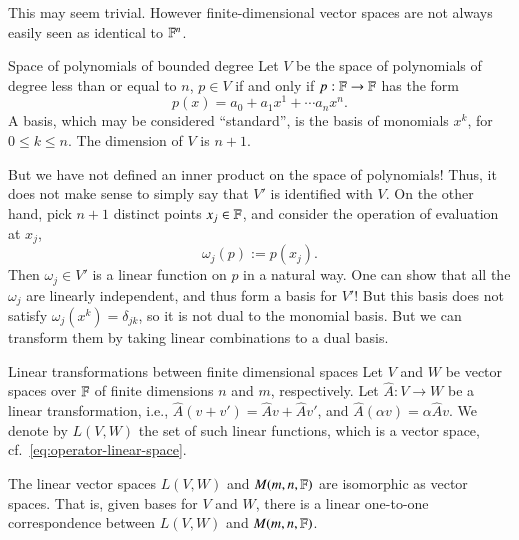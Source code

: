 This may seem trivial. However finite-dimensional vector spaces are not always easily seen as identical to $\mathbb{F}^n$.
\begin{myExample}{Space of polynomials of bounded degree}{}
    Let $V$ be the space of polynomials of degree less than or equal to $n$, $p\in V$ if and only if $p : \mathbb{F} \to \mathbb{F}$ has the form
    \begin{equation}
        p(x) = a_0 + a_1 x^1 + \cdots a_n x^n.
    \end{equation}
    A basis, which may be considered ``standard'', is the basis of monomials $x^k$, for $0\leq k \leq n$. The dimension of $V$ is $n+1$.

    But we have not defined an inner product on the space of polynomials! Thus, it does not make sense to simply say that $V'$ is identified with $V$. On the other hand, pick $n+1$ distinct points $x_j \in \mathbb{F}$, and consider the operation of evaluation at $x_j$,
    \begin{equation}
    \omega_j(p) := p(x_j).
    \end{equation}
    Then $\omega_j \in V'$ is a linear function on $p$ in a natural way. One can show that all the $\omega_j$ are linearly independent, and thus form a basis for $V'$! But this basis does not satisfy $\omega_j(x^k)= \delta_{jk}$, so it is not dual to the monomial basis. But we can transform them by taking linear combinations to a dual basis. 
\end{myExample}






\begin{myTheorem}{Linear transformations between finite dimensional spaces}{}
    Let $V$ and $W$ be vector spaces over $\mathbb{F}$ of finite dimensions $n$ and $m$, respectively. Let $\hat{A} : V \to W$ be a linear transformation, i.e., $\hat{A}(v + v') = \hat{A}v + \hat{A}v'$, and $\hat{A}(\alpha v) = \alpha \hat{A}v$. We denote by $L(V,W)$ the set of such linear functions, which is a vector space, cf.~\eqref{eq:operator-linear-space}.

    
    The linear vector spaces $L(V,W)$ and $M(m,n,\mathbb{F})$ are isomorphic as vector spaces. That is, given bases for $V$ and $W$, there is a linear one-to-one correspondence between $L(V,W)$ and $M(m,n,\mathbb{F})$. 

\end{myTheorem}

